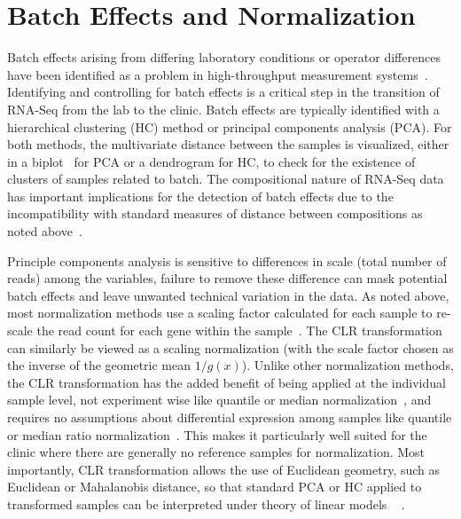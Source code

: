 \FloatBarrier
\section{Batch Effects and Normalization}

Batch effects arising from differing laboratory conditions or operator differences have been identified as a problem in high-throughput measurement systems~\cite{leek2010, chen2011}.  Identifying and controlling for batch effects is a critical step in the transition of RNA-Seq from the lab to the clinic.  Batch effects are typically identified with a hierarchical clustering (HC) method or principal components analysis (PCA).  For both methods, the multivariate distance between the samples is visualized, either in a biplot~\cite{Aitchison2002} for PCA or a dendrogram for HC, to check for the existence of clusters of samples related to batch.
The compositional nature of RNA-Seq data has important implications for the detection of batch effects due to the incompatibility with standard measures of distance between compositions as noted above~\cite{Aitchison1986,Martin-Fernandez1998}.

Principle components analysis is sensitive to differences in scale (total number of reads) among the variables, failure to remove these difference can mask potential batch effects and leave unwanted technical variation in the data.  As noted above, most normalization methods use a scaling factor calculated for each sample to re-scale the read count for each gene within the sample~\cite{Dillies2013}.  The CLR transformation can similarly be viewed as a scaling normalization (with the scale factor chosen as the inverse of the geometric mean $1/g(x)$).  Unlike other normalization methods, the CLR transformation has the added benefit of being applied at the individual sample level, not experiment wise like quantile or median normalization~\cite{Bolstad2003}, and requires no assumptions about differential expression among samples like quantile or median ratio normalization~\cite{Robinson2010,Anders2010}.  This makes it particularly well suited for the clinic where there are generally no reference samples for normalization.  Most importantly, CLR transformation allows the use of Euclidean geometry, such as Euclidean or Mahalanobis distance, so that standard PCA or HC applied to transformed samples can be interpreted under theory of linear models ~\cite{Aitchison2002} .

